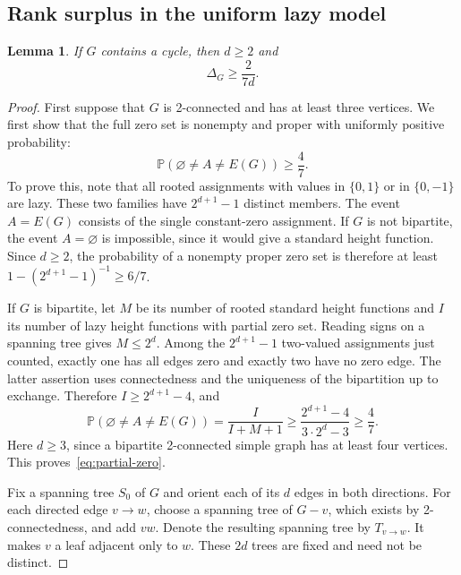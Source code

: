 \documentclass[11pt,reqno]{amsart}
\newtheorem{lemma}[theorem]{Lemma}
\theoremstyle{remark}
\numberwithin{equation}{section}
\newcommand{\PP}{\mathbb P}
\begin{document}
\subsection{Rank surplus in the uniform lazy model}

\begin{lemma}\label{lem:lazy-surplus}
If $G$ contains a cycle, then $d\ge2$ and
\begin{equation}\label{eq:lazy-surplus}
 \Delta_G\ge\frac{2}{7d}.
\end{equation}
\end{lemma}

\begin{proof}
First suppose that $G$ is 2-connected and has at least three vertices.
We first show that the full zero set is nonempty and proper with
uniformly positive probability:
\begin{equation}\label{eq:partial-zero}
 \PP(\varnothing\ne A\ne E(G))\ge\frac47.
\end{equation}
To prove this, note that all rooted assignments with values in
$\{0,1\}$ or in $\{0,-1\}$ are lazy. These two families have
$2^{d+1}-1$ distinct members. The event $A=E(G)$ consists of the single
constant-zero assignment. If $G$ is not bipartite, the event
$A=\varnothing$ is impossible, since it would give a standard height
function. Since $d\ge2$, the probability of a nonempty proper zero set
is therefore at least $1-(2^{d+1}-1)^{-1}\ge6/7$.

If $G$ is bipartite, let $M$ be its number of rooted standard height
functions and $I$ its number of lazy height functions with partial zero
set. Reading signs on a spanning tree gives $M\le2^d$. Among the
$2^{d+1}-1$ two-valued assignments just counted, exactly one has all
edges zero and exactly two have no zero edge. The latter assertion
uses connectedness and the uniqueness of the bipartition up to exchange.
Therefore $I\ge2^{d+1}-4$, and
\[
 \PP(\varnothing\ne A\ne E(G))
   =\frac{I}{I+M+1}
   \ge\frac{2^{d+1}-4}{3\cdot2^d-3}\ge\frac47.
\]
Here $d\ge3$, since a bipartite 2-connected simple graph has at least
four vertices. This proves~\eqref{eq:partial-zero}.

Fix a spanning tree $S_0$ of $G$ and orient each of its $d$ edges in
both directions. For each directed edge $v\to w$, choose a spanning
tree of $G-v$, which exists by 2-connectedness, and add $vw$. Denote
the resulting spanning tree by
$T_{v\to w}$. It makes $v$ a leaf adjacent only to $w$.
These $2d$ trees are fixed and need not be distinct.


\end{proof}
\end{document}
